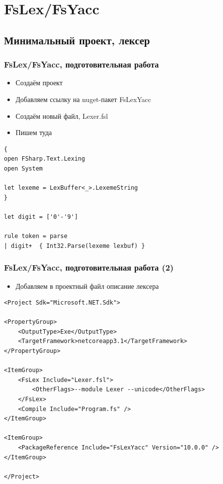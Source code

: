 \documentclass[xetex,mathserif,serif]{beamer}
\begin{document}
    \section{FsLex/FsYacc}

    \subsection{Минимальный проект, лексер}

    \begin{frame}[fragile]
        \frametitle{FsLex/FsYacc, подготовительная работа}
        \begin{itemize}
            \item Создаём проект
            \item Добавляем ссылку на nuget-пакет FsLexYacc
            \item Создаём новый файл, Lexer.fsl
            \item Пишем туда
        \end{itemize}
        \begin{small}
            \begin{verbatim}
{ 
open FSharp.Text.Lexing
open System

let lexeme = LexBuffer<_>.LexemeString
}

let digit = ['0'-'9']

rule token = parse
| digit+  { Int32.Parse(lexeme lexbuf) }
            \end{verbatim}
        \end{small}
    \end{frame}

    \begin{frame}[fragile]
        \frametitle{FsLex/FsYacc, подготовительная работа (2)}
        \begin{itemize}
            \item Добавляем в проектный файл описание лексера
        \end{itemize}
        \begin{scriptsize}
            \begin{verbatim}
<Project Sdk="Microsoft.NET.Sdk">

<PropertyGroup>
    <OutputType>Exe</OutputType>
    <TargetFramework>netcoreapp3.1</TargetFramework>
</PropertyGroup>

<ItemGroup>
    <FsLex Include="Lexer.fsl">
        <OtherFlags>--module Lexer --unicode</OtherFlags>
    </FsLex>
    <Compile Include="Program.fs" />
</ItemGroup>

<ItemGroup>
    <PackageReference Include="FsLexYacc" Version="10.0.0" />
</ItemGroup>

</Project>
            \end{verbatim}
        \end{scriptsize}
    \end{frame}
    
\end{document}

